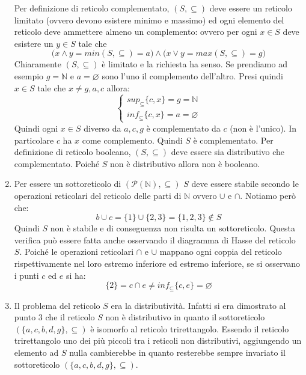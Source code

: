 \begin{enumerate}
	Per definizione di reticolo complementato, $(S,\subseteq)$ deve essere un reticolo limitato (ovvero devono esistere minimo e massimo) ed ogni elemento del reticolo deve ammettere almeno un complemento: ovvero per ogni $x \in S$ deve esistere un $y \in S$ tale che
	\begin{displaymath}
		\bigl(x \wedge y = min(S,\subseteq) = a \bigr) \land \bigl(	x \vee y = max(S,\subseteq)= g\bigr)
	\end{displaymath}
	Chiaramente $(S,\subseteq)$ è limitato e la richiesta ha senso. Se prendiamo ad esempio $g=\mathbb{N}$ e $a=\varnothing$ sono l'uno il complemento dell'altro. Presi quindi $x \in S$ tale che $x \neq g,a,c$ allora:
	\begin{displaymath}
		\begin{cases}
			sup_{\subseteq} \{c,x\} = g = \mathbb{N}\\
			inf_{\subseteq}\{c,x\}= a = \varnothing
		\end{cases}
	\end{displaymath}
	Quindi ogni $x \in S$ diverso da $a,c,g$ è complementato da $c$ (non è l'unico). In particolare $c$ ha $x$ come complemento. Quindi $S$ è complementato. Per definizione di reticolo booleano, $(S,\subseteq)$ deve essere sia distributivo che complementato. Poiché $S$ non è distributivo allora non è booleano.
	\item Per essere un sottoreticolo di $(\mathcal{P}(\mathbb{N}),\subseteq)$ $S$ deve essere stabile secondo le operazioni reticolari del reticolo delle parti di $\mathbb{N}$ ovvero $\cup$ e $\cap$. Notiamo però che:
	\begin{displaymath}
		b \cup c = \{1\} \cup \{2,3\} = \{1,2,3\} \notin S
	\end{displaymath}
	Quindi $S$ non è stabile e di conseguenza non risulta un sottoreticolo. Questa verifica può essere fatta anche osservando il diagramma di Hasse del reticolo $S$. Poiché le operazioni reticolari $\cap$ e $\cup$ mappano ogni coppia del reticolo rispettivamente nel loro estremo inferiore ed estremo inferiore, se si osservano i punti $c$ ed $e$ si ha: $$\{2\} = c \cap e  \neq inf_{\subseteq} \{c,e\} = \varnothing $$
	\item  Il problema del reticolo $S$ era la distributività. Infatti si era dimostrato al punto 3 che il reticolo $S$ non è distributivo in quanto il sottoreticolo $(\{a,c,b,d,g\},\subseteq)$ è isomorfo al reticolo trirettangolo. Essendo il reticolo trirettangolo uno dei più piccoli tra i reticoli non distributivi, aggiungendo un elemento ad $S$ nulla cambierebbe in quanto resterebbe sempre invariato il sottoreticolo $(\{a,c,b,d,g\},\subseteq)$.  \hfill \blacksquare
\end{enumerate}
